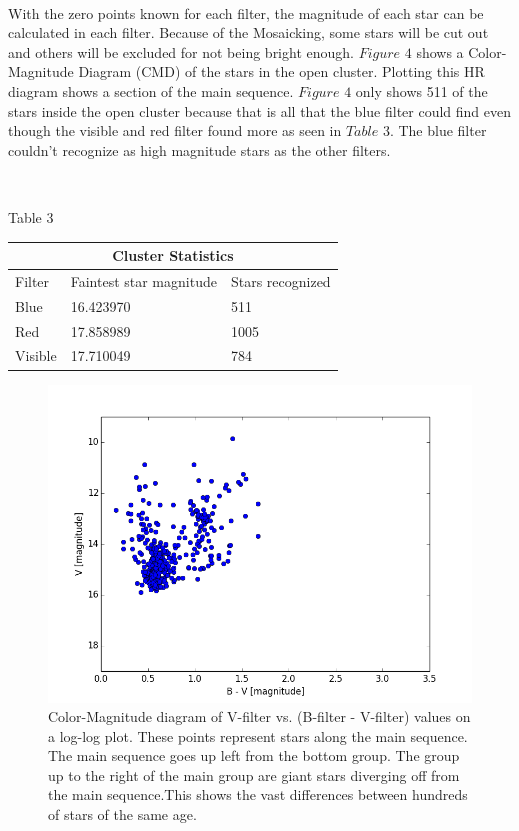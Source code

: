 \documentclass[11pt,twocolumn]{article}
\begin{document}
\ \

With the zero points known for each filter, the magnitude of each star can be calculated in each filter. Because of the Mosaicking, some stars will be cut out and others will be excluded for not being bright enough.
$Figure$ $4$ shows a Color-Magnitude Diagram (CMD) of the stars in the open cluster. Plotting this HR diagram shows a section of the main sequence. $Figure$ $4$ only shows 511 of the stars inside the open cluster because that is all that the blue filter could find even though the visible and red filter found more as seen in $Table$ $3$. The blue filter couldn't recognize as high magnitude stars as the other filters.


\ \

\begin{center}
Table 3
\end{center}
\begin{center}
\begin{tabular}[scale=0.5]{|l|l|l|}
\hline
\multicolumn{3}{|c|}{Cluster Statistics} \\
\hline
Filter & Faintest star magnitude & Stars recognized\\ 
\hline
Blue & 16.423970 & 511\\
 
\hline
Red & 17.858989 & 1005 \\
\hline
Visible & 17.710049 & 784 \\ 
\hline
\end{tabular}

\end{center}


\begin{center}
\begin{figure}
\includegraphics[scale=0.4]{figure_3}
\caption{\small{Color-Magnitude diagram of V-filter vs. (B-filter - V-filter) values on a log-log plot. These points represent stars along the main sequence. The main sequence goes up left from the bottom group. The group up to the right of the main group are giant stars diverging off from the main sequence.This shows the vast differences between hundreds of stars of the same age.}}
\end{figure}
\end{center}
\end{document}
